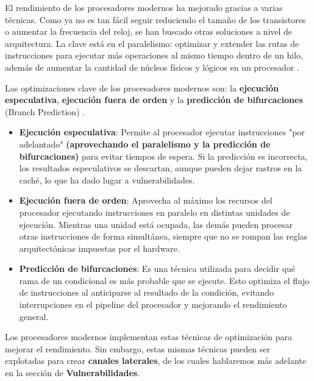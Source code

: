 \documentclass[lettersize,compsoc]{IEEEtran}
\begin{document}
El rendimiento de los procesadores modernos ha mejorado gracias a varias técnicas. Como ya no es tan fácil seguir reduciendo el tamaño de los transistores o aumentar la frecuencia del reloj, se han buscado otras soluciones a nivel de arquitectura. La clave está en el paralelismo: optimizar y extender las rutas de instrucciones para ejecutar más operaciones al mismo tiempo dentro de un hilo, además de aumentar la cantidad de núcleos físicos y lógicos en un procesador \cite{paralelismo}.

Las optimizaciones clave de los procesadores modernos son: la \textbf{ejecución especulativa}, \textbf{ejecución fuera de orden} y la \textbf{predicción de bifurcaciones} (Branch Prediction) \cite{ref}.  

\begin{itemize}
\item \textbf{Ejecución especulativa}: Permite al procesador ejecutar instrucciones "por adelantado" \textbf{(aprovechando el paralelismo y la predicción de bifurcaciones)} para evitar tiempos de espera. Si la predicción es incorrecta, los resultados especulativos se descartan, aunque pueden dejar rastros en la caché, lo que ha dado lugar a vulnerabilidades.
\item \textbf{Ejecución fuera de orden}: Aprovecha al máximo los recursos del procesador ejecutando instrucciones en paralelo en distintas unidades de ejecución. Mientras una unidad está ocupada, las demás pueden procesar otras instrucciones de forma simultánea, siempre que no se rompan las reglas arquitectónicas impuestas por el hardware.
\item \textbf{Predicción de bifurcaciones}: Es una técnica utilizada para decidir qué rama de un condicional es más probable que se ejecute. Esto optimiza el flujo de instrucciones al anticiparse al resultado de la condición, evitando interrupciones en el pipeline del procesador y mejorando el rendimiento general.
\end{itemize}


Los procesadores modernos implementan estas técnicas de optimización para mejorar el rendimiento. Sin embargo, estas mismas técnicas pueden ser explotadas para crear \textbf{canales laterales}, de los cuales hablaremos más adelante en la sección de \textbf{Vulnerabilidades}.
\end{document}
